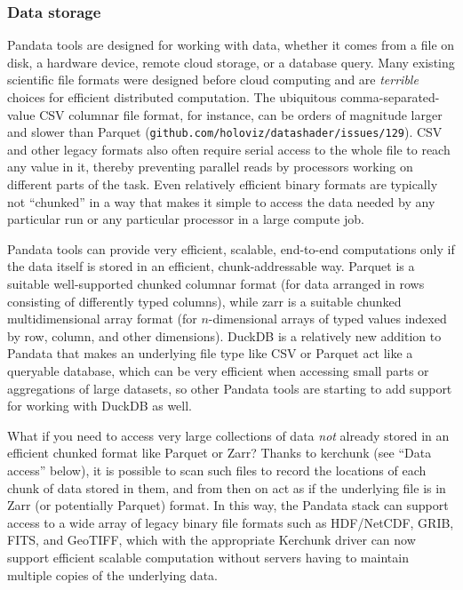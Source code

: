 \subsubsection{Data storage}

Pandata tools are designed for working with data, whether it comes from a file on disk, a hardware device, remote cloud storage, or a database query. Many existing scientific file formats were designed before cloud computing and are \emph{terrible} choices for efficient distributed computation. The ubiquitous comma-separated-value CSV columnar file format, for instance, can be orders of magnitude larger and slower than Parquet (\texttt{github.com/holoviz/datashader/issues/129}). CSV and other legacy formats also often require serial access to the whole file to reach any value in it, thereby preventing parallel reads by processors working on different parts of the task. Even relatively efficient binary formats are typically not ``chunked'' in a way that makes it simple to access the data needed by any particular run or any particular processor in a large compute job.

Pandata tools can provide very efficient, scalable, end-to-end computations only if the data itself is stored in an efficient, chunk-addressable way. Parquet is a suitable well-supported chunked columnar format (for data arranged in rows consisting of differently typed columns), while zarr is a suitable chunked multidimensional array format (for $n$-dimensional arrays of typed values indexed by row, column, and other dimensions). DuckDB is a relatively new addition to Pandata that makes an underlying file type like CSV or Parquet act like a queryable database, which can be very efficient when accessing small parts or aggregations of large datasets, so other Pandata tools are starting to add support for working with DuckDB as well.

What if you need to access very large collections of data \emph{not} already stored in an efficient chunked format like Parquet or Zarr? Thanks to kerchunk (see ``Data access'' below), it is possible to scan such files to record the locations of each chunk of data stored in them, and from then on act as if the underlying file is in Zarr (or potentially Parquet) format. In this way, the Pandata stack can support access to a wide array of legacy binary file formats such as HDF/NetCDF, GRIB, FITS, and GeoTIFF, which with the appropriate Kerchunk driver can now support efficient scalable computation without servers having to maintain multiple copies of the underlying data.

